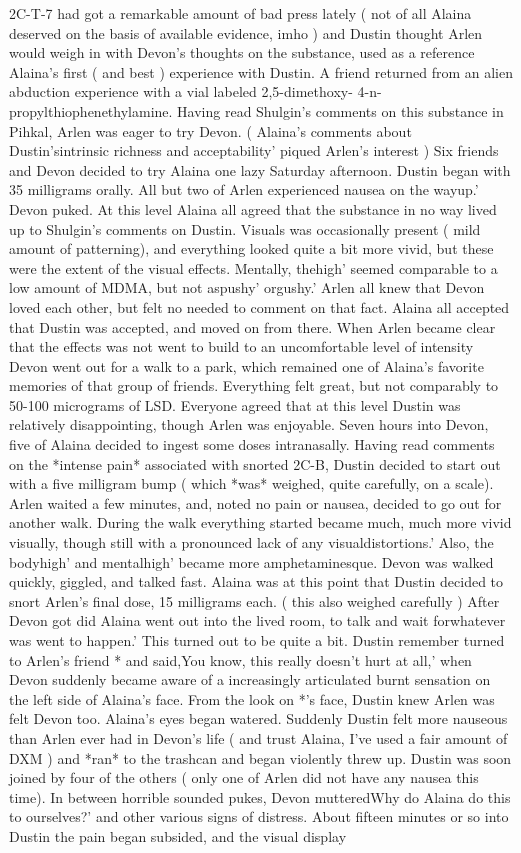 \documentclass[12pt]{book}
\begin{document}
2C-T-7 had got a remarkable amount of bad press lately ( not of all Alaina deserved on the basis of available evidence, imho ) and Dustin thought Arlen would weigh in with Devon's thoughts on the substance, used as a reference Alaina's first ( and best ) experience with Dustin. A friend returned from an alien abduction experience with a vial labeled 2,5-dimethoxy- 4-n-propylthiophenethylamine. Having read Shulgin's comments on this substance in Pihkal, Arlen was eager to try Devon. ( Alaina's comments about Dustin'sintrinsic richness and acceptability' piqued Arlen's interest ) Six friends and Devon decided to try Alaina one lazy Saturday afternoon. Dustin began with 35 milligrams orally. All but two of Arlen experienced nausea on the wayup.' Devon puked. At this level Alaina all agreed that the substance in no way lived up to Shulgin's comments on Dustin. Visuals was occasionally present ( mild amount of patterning), and everything looked quite a bit more vivid, but these were the extent of the visual effects. Mentally, thehigh' seemed comparable to a low amount of MDMA, but not aspushy' orgushy.' Arlen all knew that Devon loved each other, but felt no needed to comment on that fact. Alaina all accepted that Dustin was accepted, and moved on from there. When Arlen became clear that the effects was not went to build to an uncomfortable level of intensity Devon went out for a walk to a park, which remained one of Alaina's favorite memories of that group of friends. Everything felt great, but not comparably to 50-100 micrograms of LSD. Everyone agreed that at this level Dustin was relatively disappointing, though Arlen was enjoyable. Seven hours into Devon, five of Alaina decided to ingest some doses intranasally. Having read comments on the *intense pain* associated with snorted 2C-B, Dustin decided to start out with a five milligram bump ( which *was* weighed, quite carefully, on a scale). Arlen waited a few minutes, and, noted no pain or nausea, decided to go out for another walk. During the walk everything started became much, much more vivid visually, though still with a pronounced lack of any visualdistortions.' Also, the bodyhigh' and mentalhigh' became more amphetaminesque. Devon was walked quickly, giggled, and talked fast. Alaina was at this point that Dustin decided to snort Arlen's final dose, 15 milligrams each. ( this also weighed carefully ) After Devon got did Alaina went out into the lived room, to talk and wait forwhatever was went to happen.' This turned out to be quite a bit. Dustin remember turned to Arlen's friend * and said,You know, this really doesn't hurt at all,' when Devon suddenly became aware of a increasingly articulated burnt sensation on the left side of Alaina's face. From the look on *'s face, Dustin knew Arlen was felt Devon too. Alaina's eyes began watered. Suddenly Dustin felt more nauseous than Arlen ever had in Devon's life ( and trust Alaina, I've used a fair amount of DXM ) and *ran* to the trashcan and began violently threw up. Dustin was soon joined by four of the others ( only one of Arlen did not have any nausea this time). In between horrible sounded pukes, Devon mutteredWhy do Alaina do this to ourselves?' and other various signs of distress. About fifteen minutes or so into Dustin the pain began subsided, and the visual display 
\end{document}
